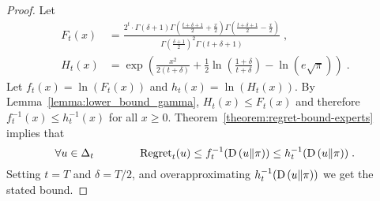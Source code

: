 \begin{proof}
Let
\begin{align*}
F_t(x) & = \frac{2^t \cdot \Gamma(\delta + 1) \Gamma(\frac{t+\delta+1}{2} + \frac{x}{2}) \Gamma(\frac{t+\delta+1}{2} - \frac{x}{2})}{\Gamma(\frac{\delta+1}{2})^2 \Gamma(t+\delta+1)} \; , \\
H_t(x) & = \exp\left(\frac{x^2}{2(t+\delta)} +\frac{1}{2} \ln \left(\frac{1+\delta}{t+\delta}\right) - \ln(e \sqrt{\pi})\right) \; .
\end{align*}
Let $f_t(x) = \ln(F_t(x))$ and $h_t(x)=\ln(H_t(x))$. By Lemma~\ref{lemma:lower_bound_gamma}, $H_t(x) \le F_t(x)$
and therefore $f^{-1}_t(x) \leq h^{-1}_t(x)$ for all $x \ge 0$.
Theorem~\ref{theorem:regret-bound-experts} implies that
\[
\forall u \in \Delta_t \qquad \qquad
\operatorname{Regret}_t(u) \le f_t^{-1}(\operatorname{D}\left({u}\middle\|{\pi}\right)) \le h_t^{-1}(\operatorname{D}\left({u}\middle\|{\pi}\right)) \; .
\]
Setting $t=T$ and $\delta = T/2$, and overapproximating $h_t^{-1}(\operatorname{D}\left({u}\middle\|{\pi}\right))$ we get the stated bound.
\end{proof}
